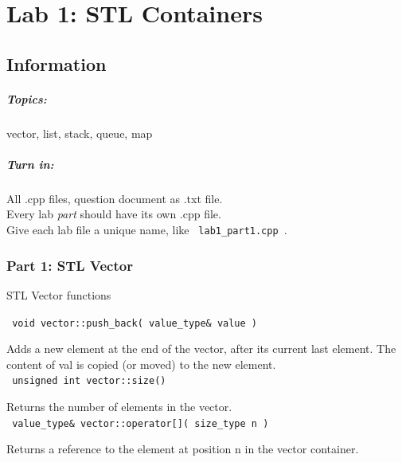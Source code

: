 \documentclass[a4paper,12pt]{book}
\title{}
\author{Rachel Morris}
\date{\today}
\begin{document}
    \chapter*{Lab 1: STL Containers} 
        \section*{Information}
            \paragraph{ Topics: } vector, list, stack, queue, map
            \paragraph{ Turn in: } All .cpp files, question document as .txt file. \\
                \tab[2.3cm] Every lab \textit{ part } should have its own .cpp file. \\
                \tab[2.3cm] Give each lab file a unique name, like \texttt{ lab1\_part1.cpp }.


            \subsection*{Part 1: STL Vector}
            
                \begin{intro}{STL Vector functions}

                    \footnotesize
                    
                    \texttt{ void vector::push\_back( value\_type\&  value ) }

                        Adds a new element at the end of the vector, after its current last element.
                        The content of val is copied (or moved) to the new element. \\
                    
                    \texttt{ unsigned int vector::size() }

                        Returns the number of elements in the vector. \\
                    
                    \texttt{ value\_type\& vector::operator[]( size\_type n ) }

                        Returns a reference to the element at position n in the vector container. \\
                    
                    

                    
                \end{intro}
            
\end{document}
